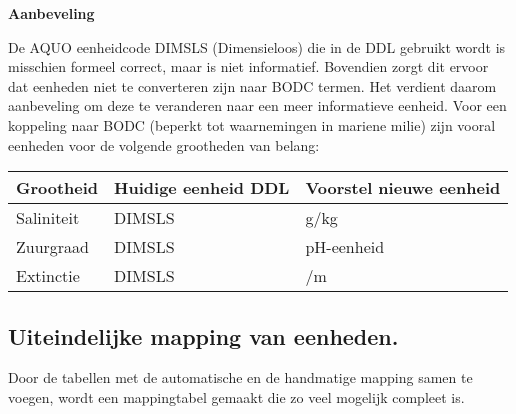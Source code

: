 \documentclass[
]{book}
\begin{document}
\textbf{Aanbeveling}

De AQUO eenheidcode DIMSLS (Dimensieloos) die in de DDL gebruikt wordt is misschien formeel correct, maar is niet informatief. Bovendien zorgt dit ervoor dat eenheden niet te converteren zijn naar BODC termen. Het verdient daarom aanbeveling om deze te veranderen naar een meer informatieve eenheid. Voor een koppeling naar BODC (beperkt tot waarnemingen in mariene milie) zijn vooral eenheden voor de volgende grootheden van belang:

\begin{longtable}[]{@{}lll@{}}
\toprule
Grootheid & Huidige eenheid DDL & Voorstel nieuwe eenheid \\
\midrule
\endhead
Saliniteit & DIMSLS & g/kg \\
Zuurgraad & DIMSLS & pH-eenheid \\
Extinctie & DIMSLS & /m \\
\bottomrule
\end{longtable}

\hypertarget{uiteindelijke-mapping-van-eenheden.}{%
\subsection{Uiteindelijke mapping van eenheden.}\label{uiteindelijke-mapping-van-eenheden.}}

Door de tabellen met de automatische en de handmatige mapping samen te voegen, wordt een mappingtabel gemaakt die zo veel mogelijk compleet is.
\end{document}
